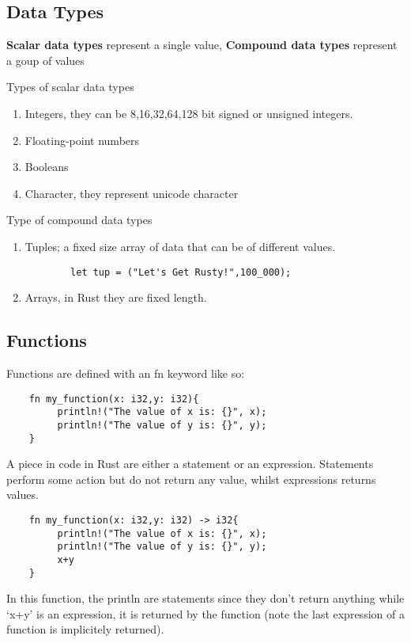 \subsection{Data Types}
\begin{definition}
    \textbf{Scalar data types} represent a single value, \textbf{Compound data types} represent a goup of values
\end{definition}
Types of scalar data types\begin{enumerate}
    \item Integers, they can be 8,16,32,64,128 bit signed or unsigned integers.
    \item Floating-point numbers
    \item Booleans
    \item Character, they represent unicode character
\end{enumerate}
Type of compound data types\begin{enumerate}
    \item Tuples; a fixed size array of data that can be of different values.
    \begin{lstlisting}
        let tup = ("Let's Get Rusty!",100_000);
    \end{lstlisting}
    \item Arrays, in Rust they are fixed length.
\end{enumerate}
\subsection{Functions}
Functions are defined with an fn keyword like so:\begin{lstlisting}
    fn my_function(x: i32,y: i32){
         println!("The value of x is: {}", x);
         println!("The value of y is: {}", y);
    }
\end{lstlisting}

A piece in code in Rust are either a statement or an expression. Statements perform some action but do not return any value, whilst expressions returns values. 
\begin{lstlisting}
    fn my_function(x: i32,y: i32) -> i32{
         println!("The value of x is: {}", x);
         println!("The value of y is: {}", y);
         x+y
    }
\end{lstlisting}

In this function, the println are statements since they don't return anything while `x+y' is an expression, it is returned by the function (note the last expression of a function is implicitely returned). 

